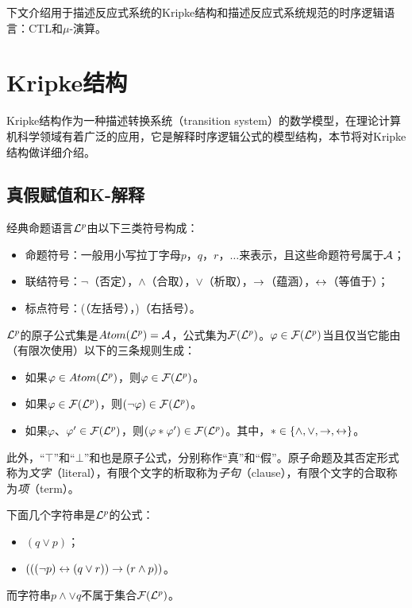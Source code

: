 下文介绍用于描述反应式系统的Kripke结构和描述反应式系统规范的时序逻辑语言：CTL和$\mu$-演算。

\section{Kripke结构}
Kripke结构作为一种描述转换系统（transition system）的数学模型，在理论计算机科学领域有着广泛的应用，它是解释时序逻辑公式的模型结构，本节将对Kripke结构做详细介绍。

\subsection{真假赋值和K-解释}
经典命题语言${\cal L}^p$由以下三类符号构成：
\begin{itemize}
	\item 命题符号：一般用小写拉丁字母$p$，$q$，$r$，$\dots$来表示，且这些命题符号属于${\cal A}$；
	\item 联结符号：$\neg$（否定），$\wedge$（合取），$\vee$（析取），$\rightarrow$（蕴涵），$\leftrightarrow$（等值于）；
	\item 标点符号：(（左括号），)（右括号）。
\end{itemize}

${\cal L}^p$的原子公式集是$Atom({\cal L}^p) = {\cal A}$，公式集为${\cal F}({\cal L}^p)$。$\varphi\in {\cal F}({\cal L}^p)$当且仅当它能由（有限次使用）以下的三条规则生成\cite{luzhongwan1989}：
\begin{itemize}
	\item 如果$\varphi\in Atom({\cal L}^p)$，则$\varphi \in {\cal F}({\cal L}^p)$。
	\item 如果$\varphi \in {\cal F}({\cal L}^p)$，则$(\neg \varphi)\in {\cal F}({\cal L}^p)$。
	\item 如果$\varphi$、$\varphi'\in {\cal F}({\cal L}^p)$，则$(\varphi * \varphi')\in {\cal F}({\cal L}^p)$。其中，$*\in \{\wedge,\vee, \rightarrow, \leftrightarrow\}$。
\end{itemize}
此外，“$\top$”和“$\bot$”和也是原子公式，分别称作“真”和“假”。原子命题及其否定形式称为\emph{文字}（literal），有限个文字的析取称为\emph{子句}（clause），有限个文字的合取称为\emph{项}（term）。

\begin{example}\label{exp:pro:form}
	下面几个字符串是${\cal L}^p$的公式：
	\begin{itemize}
		\item $(q \vee p)$；
		\item $(((\neg p)\leftrightarrow(q\vee r))\rightarrow(r \wedge p))$。
	\end{itemize}
	而字符串$p\wedge \vee q$不属于集合${\cal F}({\cal L}^p)$。
\end{example}


